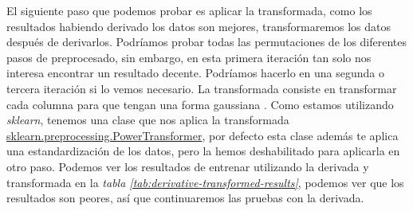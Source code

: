 El siguiente paso que podemos probar es aplicar la transformada, como los resultados habiendo derivado los datos son mejores, transformaremos los datos después de derivarlos. Podríamos probar todas las permutaciones de los diferentes pasos de preprocesado, sin embargo, en esta primera iteración tan solo nos interesa encontrar un resultado decente. Podríamos hacerlo en una segunda o tercera iteración si lo vemos necesario. La transformada consiste en transformar cada columna para que tengan una forma gaussiana \cite{sklearnp39:online}. Como estamos utilizando \textit{sklearn}, tenemos una clase que nos aplica la transformada \href{https://scikit-learn.org/stable/modules/generated/sklearn.preprocessing.PowerTransformer.html}{sklearn.preprocessing.PowerTransformer}, por defecto esta clase además te aplica una estandardización de los datos, pero la hemos deshabilitado para aplicarla en otro paso. Podemos ver los resultados de entrenar utilizando la derivada y transformada en la \textit{tabla \ref{tab:derivative-transformed-results}}, podemos ver que los resultados son peores, así que continuaremos las pruebas con la derivada.

